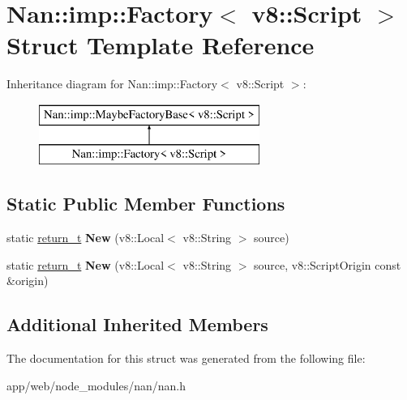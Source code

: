 \hypertarget{struct_nan_1_1imp_1_1_factory_3_01v8_1_1_script_01_4}{}\section{Nan\+:\+:imp\+:\+:Factory$<$ v8\+:\+:Script $>$ Struct Template Reference}
\label{struct_nan_1_1imp_1_1_factory_3_01v8_1_1_script_01_4}
Inheritance diagram for Nan\+:\+:imp\+:\+:Factory$<$ v8\+:\+:Script $>$\+:\begin{figure}[H]
\begin{center}
\leavevmode
\includegraphics[height=2.000000cm]{struct_nan_1_1imp_1_1_factory_3_01v8_1_1_script_01_4}
\end{center}
\end{figure}
\subsection*{Static Public Member Functions}
\begin{DoxyCompactItemize}
\item 
\mbox{\label{struct_nan_1_1imp_1_1_factory_3_01v8_1_1_script_01_4_a8126e4a090591ae92560dedf87c19b96}} 
static \hyperlink{class_nan_1_1_maybe_local}{return\+\_\+t} {\bfseries New} (v8\+::\+Local$<$ v8\+::\+String $>$ source)
\item 
\mbox{\label{struct_nan_1_1imp_1_1_factory_3_01v8_1_1_script_01_4_ada88d8317b271aa8212ae6b6a54470a6}} 
static \hyperlink{class_nan_1_1_maybe_local}{return\+\_\+t} {\bfseries New} (v8\+::\+Local$<$ v8\+::\+String $>$ source, v8\+::\+Script\+Origin const \&origin)
\end{DoxyCompactItemize}
\subsection*{Additional Inherited Members}


The documentation for this struct was generated from the following file\+:\begin{DoxyCompactItemize}
\item 
app/web/node\+\_\+modules/nan/nan.\+h\end{DoxyCompactItemize}
